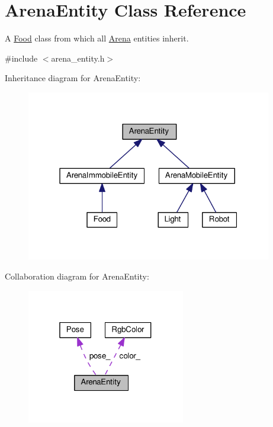 \hypertarget{classArenaEntity}{}\section{Arena\+Entity Class Reference}
\label{classArenaEntity}


A \hyperlink{classFood}{Food} class from which all \hyperlink{classArena}{Arena} entities inherit.  




{\ttfamily \#include $<$arena\+\_\+entity.\+h$>$}



Inheritance diagram for Arena\+Entity\+:\nopagebreak
\begin{figure}[H]
\begin{center}
\leavevmode
\includegraphics[width=304pt]{classArenaEntity__inherit__graph}
\end{center}
\end{figure}


Collaboration diagram for Arena\+Entity\+:\nopagebreak
\begin{figure}[H]
\begin{center}
\leavevmode
\includegraphics[width=196pt]{classArenaEntity__coll__graph}
\end{center}
\end{figure}
